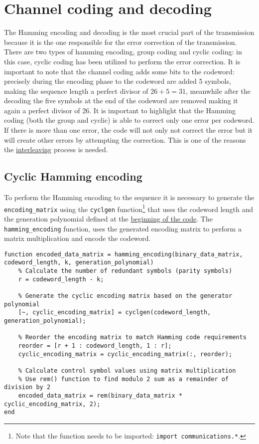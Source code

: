 \vspace{40px} \section{Channel coding and decoding}
The Hamming encoding and decoding is the most crucial part of the transmission because it is the one responsible for the error correction of the transmission. There are two types of hamming encoding, group coding and cyclic coding: in this case, cyclic coding has been utilized to perform the error correction. It is important to note that the channel coding adds some bits to the codeword: precisely during the encoding phase to the codeword are added 5 symbols, making the sequence length a perfect divisor of $26 + 5 = 31$, meanwhile after the decoding the five symbols at the end of the codeword are removed making it again a perfect divisor of 26. It is important to highlight that the Hamming coding (both the group and cyclic) is able to correct only one error per codeword. If there is more than one error, the code will not only not correct the error but it will create other errors by attempting the correction. This is one of the reasons the \hyperref[interleaving-process]{interleaving} process is needed.





\subsection{Cyclic Hamming encoding}\label{hamming-encoding}
To perform the Hamming encoding to the sequence it is necessary to generate the \texttt{encoding\_matrix} using the \texttt{cyclgen} function\footnote{Note that the function needs to be imported: \texttt{import communications.*}.} that uses the codeword length and the generation polynomial defined at the \hyperref[initial-parameters]{beginning of the code}. The \texttt{hamming\_encoding} function, uses the generated encoding matrix to perform a matrix multiplication and encode the codeword.

\begin{lstlisting}
function encoded_data_matrix = hamming_encoding(binary_data_matrix, codeword_length, k, generation_polynomial)
    % Calculate the number of redundant symbols (parity symbols)
    r = codeword_length - k;
    
    % Generate the cyclic encoding matrix based on the generator polynomial
    [~, cyclic_encoding_matrix] = cyclgen(codeword_length, generation_polynomial);
    
    % Reorder the encoding matrix to match Hamming code requirements
    reorder = [r + 1 : codeword_length, 1 : r];
    cyclic_encoding_matrix = cyclic_encoding_matrix(:, reorder);
    
    % Calculate control symbol values using matrix multiplication
    % Use rem() function to find modulo 2 sum as a remainder of division by 2
    encoded_data_matrix = rem(binary_data_matrix * cyclic_encoding_matrix, 2);
end
\end{lstlisting}


